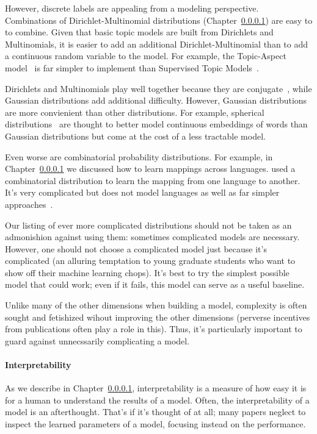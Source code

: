 However, discrete labels are appealing from a modeling perspective.
Combinations of Dirichlet-Multinomial distributions (Chapter~\ref{})
are easy to to combine.  Given that basic topic models are built from
Dirichlets and Multinomials, it is easier to add an additional
Dirichlet-Multinomial than to add a continuous random variable to the
model.  For example, the Topic-Aspect model~\citep{} is far simpler to
implement than Supervised Topic Models~\citep{}.

Dirichlets and Multinomials play well together because they are
conjugate~\citep{}, while Gaussian distributions add additional
difficulty.  However, Gaussian distributions are more convienient than
other distributions.  For example, spherical distributions~\citep{} are thought
to better model continuous embeddings of words than Gaussian
distributions but come at the cost of a less tractable model.

Even worse are combinatorial probability distributions.  For example,
in Chapter~\ref{} we discussed how to learn mappings across
languages.  \citet{} used a combinatorial distribution to learn the
mapping from one language to another.  It's very complicated but
does not model languages as well as far simpler approaches~\citep{}.

Our listing of ever more complicated distributions should not be taken
as an admonishion against using them: sometimes complicated models are
necessary.  However, one should not choose a complicated model just
because it's complicated (an alluring temptation to young graduate
students who want to show off their machine learning chops).  It's
best to try the simplest possible model that could work; even if it
fails, this model can serve as a useful baseline.

Unlike many of the other dimensions when building a model, complexity
is often sought and fetishized wihout improving the other dimensions
(perverse incentives from publications often play a role in this).
Thus, it's particularly important to guard against unnecssarily
complicating a model.

\paragraph{Interpretability}

As we describe in Chapter~\ref{}, interpretability is a measure of how
easy it is for a human to understand the results of a model.  Often,
the interpretability of a model is an afterthought.  That's if it's thought of
at all; many papers neglect to inspect the learned parameters of a
model, focusing instead on the performance.


